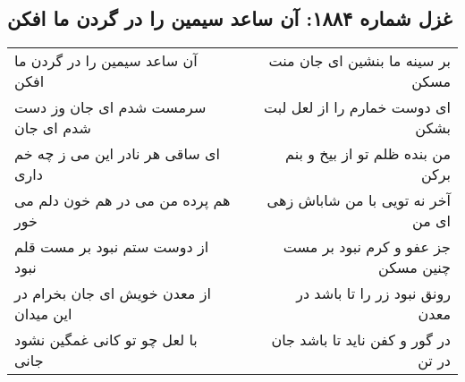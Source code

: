 \begin{center}
\section*{غزل شماره ۱۸۸۴: آن ساعد سیمین را در گردن ما افکن}
\label{sec:1884}
\begin{longtable}{l p{0.5cm} r}
آن ساعد سیمین را در گردن ما افکن
&&
بر سینه ما بنشین ای جان منت مسکن
\\
سرمست شدم ای جان وز دست شدم ای جان
&&
ای دوست خمارم را از لعل لبت بشکن
\\
ای ساقی هر نادر این می ز چه خم داری
&&
من بنده ظلم تو از بیخ و بنم برکن
\\
هم پرده من می در هم خون دلم می خور
&&
آخر نه تویی با من شاباش زهی ای من
\\
از دوست ستم نبود بر مست قلم نبود
&&
جز عفو و کرم نبود بر مست چنین مسکن
\\
از معدن خویش ای جان بخرام در این میدان
&&
رونق نبود زر را تا باشد در معدن
\\
با لعل چو تو کانی غمگین نشود جانی
&&
در گور و کفن ناید تا باشد جان در تن
\\
\end{longtable}
\end{center}
